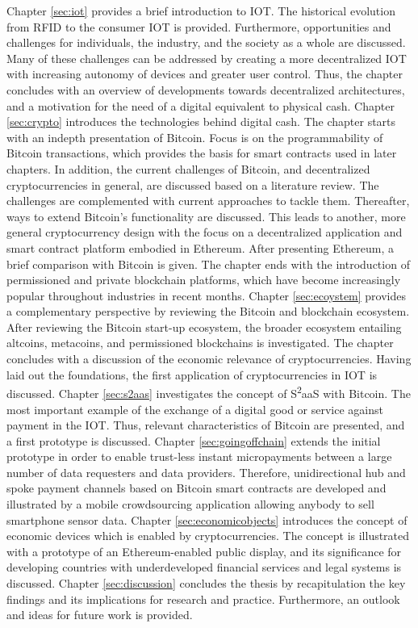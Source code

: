 Chapter \ref{sec:iot} provides a brief introduction to \ac{IOT}. The historical evolution from \ac{RFID} to the consumer \ac{IOT} is provided. Furthermore, opportunities and challenges for individuals, the industry, and the society as a whole are discussed. Many of these challenges can be addressed by creating a more decentralized \ac{IOT} with increasing autonomy of devices and greater user control. Thus, the chapter concludes with an overview of developments towards decentralized architectures, and a motivation for the need of a digital equivalent to physical cash. Chapter \ref{sec:crypto} introduces the technologies behind digital cash. The chapter starts with an indepth presentation of Bitcoin. Focus is on the programmability of Bitcoin transactions, which provides the basis for smart contracts used in later chapters. In addition, the current challenges of Bitcoin, and decentralized cryptocurrencies in general, are discussed based on a literature review. The challenges are complemented with current approaches to tackle them. 
Thereafter, ways to extend Bitcoin's functionality are discussed. This leads to another, more general cryptocurrency design with the focus on a decentralized application and smart contract platform embodied in Ethereum. After presenting Ethereum, a brief comparison with Bitcoin is given. The chapter ends with the introduction of permissioned and private blockchain platforms, which have become increasingly popular throughout industries in recent months. Chapter \ref{sec:ecoystem} provides a complementary perspective by reviewing the Bitcoin and blockchain ecosystem. After reviewing the Bitcoin start-up ecosystem, the broader ecosystem entailing altcoins, metacoins, and permissioned blockchains is investigated. The chapter concludes with a discussion of the economic relevance of cryptocurrencies. Having laid out the foundations, the first application of cryptocurrencies in \ac{IOT} is discussed. Chapter \ref{sec:s2aas} investigates the concept of S\textsuperscript{2}aaS with Bitcoin. The most important example of the exchange of a digital good or service against payment in the \ac{IOT}. Thus, relevant characteristics of Bitcoin are presented, and a first prototype is discussed. Chapter \ref{sec:goingoffchain} extends the initial prototype in order to enable trust-less instant micropayments between a large number of data requesters and data providers. Therefore, unidirectional hub and spoke payment channels based on Bitcoin smart contracts are developed and illustrated by a mobile crowdsourcing application allowing anybody to sell smartphone sensor data. Chapter \ref{sec:economicobjects} introduces the concept of economic devices which is enabled by cryptocurrencies. The concept is illustrated with a prototype of an Ethereum-enabled public display, and its significance for developing countries with underdeveloped financial services and legal systems is discussed. Chapter \ref{sec:discussion} concludes the thesis by recapitulation the key findings and its implications for research and practice. Furthermore, an outlook and ideas for future work is provided.

